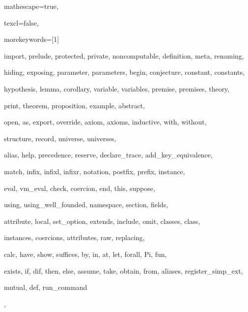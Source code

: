 




 {




mathescape=true,


texcl=false,




morekeywords=[1]{

import, prelude, protected, private, noncomputable, definition, meta, renaming,

hiding, exposing, parameter, parameters, begin, conjecture, constant, constants,

hypothesis, lemma, corollary, variable, variables, premise, premises, theory,

print, theorem, proposition, example, abstract,

open, as, export, override, axiom, axioms, inductive, with, without,

structure, record, universe, universes,

alias, help, precedence, reserve, declare_trace, add_key_equivalence,

match, infix, infixl, infixr, notation, postfix, prefix, instance,

eval, vm_eval, check, coercion, end, this, suppose,

using, using_well_founded, namespace, section, fields,

attribute, local, set_option, extends, include, omit, classes, class,

instances, coercions, attributes, raw, replacing,

calc, have, show, suffices, by, in, at, let, forall, Pi, fun,

exists, if, dif, then, else, assume, take, obtain, from, aliases, register_simp_ext,

mutual, def, run_command

},




}
